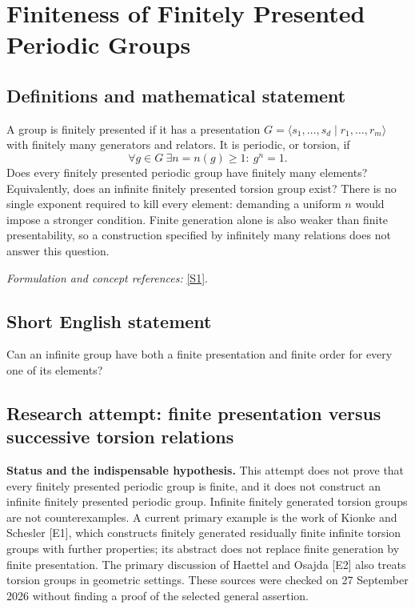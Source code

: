 \documentclass[11pt]{article}
\begin{document}
\section*{\texorpdfstring{Finiteness of Finitely Presented Periodic Groups}{Finiteness of Finitely Presented Periodic Groups}}\label{1195}
\subsection{Definitions and mathematical statement}
A group is finitely presented if it has a presentation $G=\langle s_1,\ldots,s_d\mid r_1,\ldots,r_m\rangle$ with finitely many generators and relators. It is periodic, or torsion, if
\[
 \forall g\in G\ \exists n=n(g)\ge1:\ g^n=1.
\]
Does every finitely presented periodic group have finitely many elements? Equivalently, does an infinite finitely presented torsion group exist? There is no single exponent required to kill every element: demanding a uniform $n$ would impose a stronger condition. Finite generation alone is also weaker than finite presentability, so a construction specified by infinitely many relations does not answer this question.
\par\smallskip\textit{Formulation and concept references:} \href{https://groupprops.subwiki.org/wiki/Finitely_presented_periodic_group}{[S1]}.

\subsection{Short English statement}
Can an infinite group have both a finite presentation and finite order for every one of its elements?
\subsection{Research attempt: finite presentation versus successive torsion relations}
\textbf{Status and the indispensable hypothesis.} This attempt does not prove that every finitely presented periodic group is finite, and it does not construct an infinite finitely presented periodic group. Infinite finitely generated torsion groups are not counterexamples. A current primary example is the work of Kionke and Schesler [E1], which constructs finitely generated residually finite infinite torsion groups with further properties; its abstract does not replace finite generation by finite presentation. The primary discussion of Haettel and Osajda [E2] also treats torsion groups in geometric settings. These sources were checked on 27 September 2026 without finding a proof of the selected general assertion.
\end{document}
